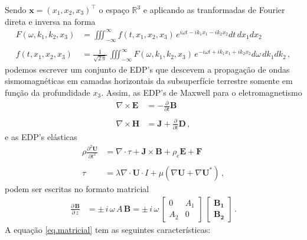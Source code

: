Sendo $\mathbf{x}=(x_1,x_2,x_3)^{\top}$ o espa\c{c}o $\mathbb{R}^3$ e aplicando as tranformadas de Fourier direta e inversa na forma
\begin{align*}
F(\omega,k_1,k_2,x_3) &= \iiint_{-\infty}^{\infty}f(t,x_1,x_2,x_3)\,e^{i\omega t-ik_1x_1-ik_2x_2}dt\,dx_1dx_2\\\\
f(t,x_1,x_2,x_3) &= \frac{1}{\sqrt{2\,\pi}}\,\iiint_{-\infty}^{\infty}F(\omega,k_1,k_2,x_3)\,e^{-i\omega t+ik_1x_1+ik_2x_2}d\omega\,dk_1dk_2\,,
\end{align*}
podemos escrever um conjunto de EDP's que descevem a propaga\c{c}\~ao de ondas sismomagn\'eticas em camadas horizontais da subsuperf\'icie terrestre somente em fun\c{c}\~ao da profundidade $x_3$. Assim, as EDP's de Maxwell para o eletromagnetismo
\begin{align}\label{eq.faraday_ampere}\nonumber
\nabla\times\mathbf{E}&=-\frac{\partial}{\partial t}\mathbf{B}\\\\\nonumber
\nabla\times\mathbf{H}&=\mathbf{J}+\frac{\partial}{\partial t}\mathbf{D}\,,
\end{align}
e as EDP's el\'asticas
\begin{align}\label{eq.cauchy_hooke}\nonumber
\rho\frac{\partial^2 \mathbf{U}}{\partial t^2}&=\nabla\cdot\tau +\mathbf{J}\times \mathbf{B} +\rho_e\mathbf{E} +\mathbf{F}\\\\\nonumber
\tau&=\lambda\nabla\cdot \mathbf{U}\cdot I + \mu(\nabla \mathbf{U}+\nabla \mathbf{U}^*)\,,
\end{align}
podem ser escritas no formato matricial 
\begin{align}\label{eq.matricial}
\frac{\partial\,\mathbf{B}}{\partial\,z} &= \pm\,i\,\omega\,A\,\mathbf{B} = \pm\,i\,\omega\,
\begin{bmatrix}
0&A_1\\
A_2&0
\end{bmatrix}\,
\begin{bmatrix}
\mathbf{B_1}\\
\mathbf{B_2}	
\end{bmatrix}\,.
\end{align}
A equação \ref{eq.matricial} tem as seguintes caracter\'isticas:
